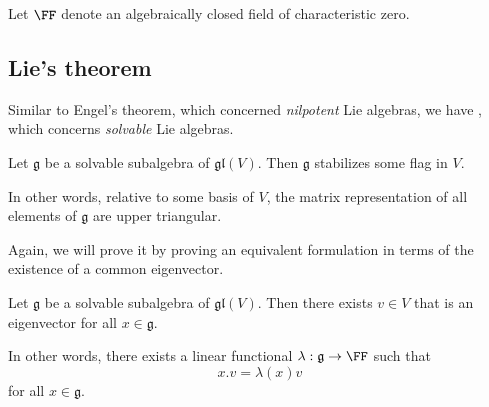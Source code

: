 \documentclass{article}
\newcommand*\frkg{{\ensuremath{\mathfrak{g}}}}
\newcommand*\gl{\ensuremath{\mathfrak{gl}}}
\newcommand*\acts{.}
\begin{document}
\begin{convention}
    Let $\FF$ denote an algebraically closed field of characteristic zero.
\end{convention}

\subsection{Lie's theorem}

Similar to Engel's theorem, which concerned \textit{nilpotent} Lie algebras, we have , which concerns \textit{solvable} Lie algebras.

\begin{theorem}
    Let $\frkg$ be a solvable subalgebra of $\gl(V)$.
    Then $\frkg$ stabilizes some flag in $V$.
\end{theorem}

In other words, relative to some basis of $V$, the matrix representation of all elements of $\frkg$ are upper triangular.

Again, we will prove it by proving an equivalent formulation in terms of the existence of a common eigenvector.

\begin{theorem}
    \label{thm:SolvableAlgebraHasCommonEigenvector}
    Let $\frkg$ be a solvable subalgebra of $\gl(V)$.
    Then there exists $v \in V$ that is an eigenvector for all $x \in \frkg$.

    In other words, there exists a linear functional $\lambda: \frkg \to \FF$ such that 
    \[
        x \acts v
        =
        \lambda(x)v
    \]
    for all $x \in \frkg$.
\end{theorem}
\end{document}
